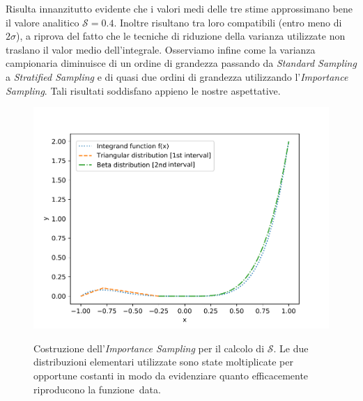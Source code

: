 \noindent Risulta innanzitutto evidente che i valori medi delle tre stime approssimano bene il valore analitico $\mathcal{S}=0.4$. Inoltre risultano tra loro compatibili ({entro meno di}~$2\sigma$), a riprova del fatto che le tecniche di riduzione della varianza utilizzate non traslano il valor medio dell'integrale. Osserviamo infine come la varianza campionaria diminuisce di un ordine di grandezza passando da \textit{Standard Sampling} a \textit{Stratified Sampling} e di quasi due ordini di grandezza utilizzando l'\textit{Importance Sampling}. Tali risultati soddisfano appieno le nostre aspettative.

\begin{figure}
	\centering
	\caption{Costruzione dell'\emph{Importance Sampling} per il calcolo di $\mathcal{S}$. Le due distribuzioni elementari utilizzate sono state moltiplicate per opportune costanti in modo da evidenziare quanto efficacemente riproducono la funzione~data.}
	\includegraphics[width=.77\textwidth, trim={0 .3cm 0 1.3cm},clip]{Immagini/Es4ImportanceSampling.pdf}
	\label{fig:MCImpSampl}
\end{figure}

\newpage

